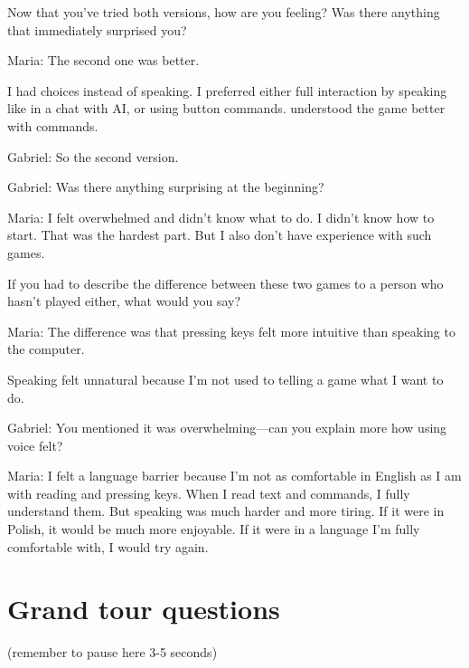 \begin{QandA}
   \item Now that you’ve tried both versions, how are you feeling? Was there anything that immediately surprised you?
         \begin{answered}
            Maria: The second one was better.

            I had choices instead of speaking.
            I preferred either full interaction by speaking like in a chat with AI, or using button commands.
            understood the game better with commands.

            Gabriel: So the second version.

            Gabriel: Was there anything surprising at the beginning?

            Maria: I felt overwhelmed and didn’t know what to do.
            I didn’t know how to start.
            That was the hardest part.
             But I also don’t have experience with such games.

            \end{answered}

   \item If you had to describe the difference between these two games to a person who hasn't played either, what would you say?
         \begin{answered}
               Maria: The difference was that pressing keys felt more intuitive than speaking to the computer.

               Speaking felt unnatural because I’m not used to telling a game what I want to do.

               Gabriel: You mentioned it was overwhelming—can you explain more how using voice felt?

               Maria: I felt a language barrier because I’m not as comfortable in English as I am with reading and pressing keys.
               When I read text and commands, I fully understand them.
               But speaking was much harder and more tiring.
               If it were in Polish, it would be much more enjoyable.
               If it were in a language I’m fully comfortable with, I would try again.

         \end{answered}
         
\end{QandA}




\section{Grand tour questions}
(remember to pause here 3-5 seconds)

